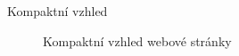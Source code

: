 \documentclass[14pt, hyperref={unicode}]{beamer}
\begin{document}
\begin{frame}{Kompaktní vzhled}
\begin{figure}[H]

      \caption{Kompaktní vzhled webové stránky}%
    \end{figure}
  \end{frame}
\end{document}
